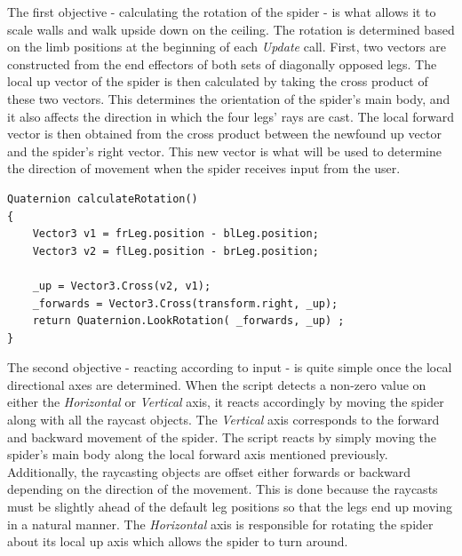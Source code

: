 The first objective - calculating the rotation of the spider - is what allows it
to scale walls and walk upside down on the ceiling. The rotation is determined
based on the limb positions at the beginning of each \textit{Update} call.
First, two vectors are constructed from the end effectors of both sets of
diagonally opposed legs. The local up vector of the spider is then calculated by
taking the cross product of these two vectors. This determines the orientation
of the spider's main body, and it also affects the direction in which the four legs'
rays are cast. The local forward vector is then obtained from the cross product
between the newfound up vector and the spider's right vector. This new vector is
what will be used to determine the direction of movement when the spider
receives input from the user.


\begin{lstlisting}[basicstyle=\footnotesize, numbers=none,frame=single,
caption={Calculating the spider's rotation},captionpos=b, label=rotation, language={[Sharp]c}]
Quaternion calculateRotation()
{
    Vector3 v1 = frLeg.position - blLeg.position;
    Vector3 v2 = flLeg.position - brLeg.position;
    
    _up = Vector3.Cross(v2, v1);
    _forwards = Vector3.Cross(transform.right, _up);
    return Quaternion.LookRotation( _forwards, _up) ;
}
\end{lstlisting}

The second objective - reacting according to input - is quite simple once the
local directional axes are determined. When the script detects a non-zero value
on either the \textit{Horizontal} or \textit{Vertical} axis, it reacts
accordingly by moving the spider along with all the raycast objects. The
\textit{Vertical} axis corresponds to the forward and backward movement of the
spider. The script reacts by simply moving the spider's main body along the
local forward axis mentioned previously. Additionally, the raycasting objects
are offset either forwards or backward depending on the direction of the
movement. This is done because the raycasts must be slightly ahead of the
default leg positions so that the legs end up moving in a natural manner.
The \textit{Horizontal} axis is responsible for rotating the spider about its
local up axis which allows the spider to turn around. 


